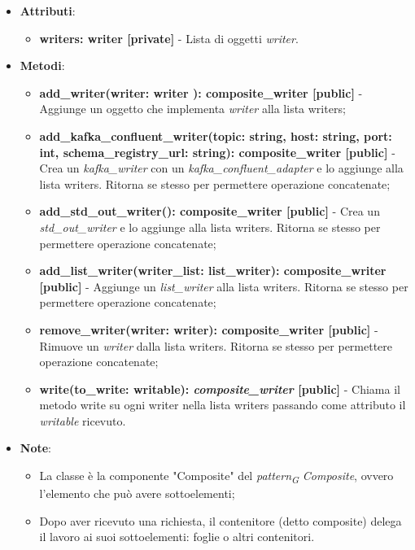 \begin{itemize}
    \begin{itemize}
    \item\textbf{Attributi}:
        \begin{itemize}
        \item \textbf{writers: writer [private]} - Lista di oggetti \textit{writer}.
    \end{itemize}
    \item \textbf{Metodi}:
    \begin{itemize}
        \item \textbf{add\_writer(writer: writer ): composite\_writer [public]} - Aggiunge un oggetto che implementa \textit{writer} alla lista writers;
        \item \textbf{add\_kafka\_confluent\_writer(topic: string, host: string, port: int, schema\_registry\_url: string): composite\_writer [public]} - Crea un \textit{kafka\_writer} con un \textit{kafka\_confluent\_adapter} e lo aggiunge alla lista writers. Ritorna se stesso per permettere operazione concatenate;
        \item \textbf{add\_std\_out\_writer(): composite\_writer [public]} - Crea un \textit{std\_out\_writer} e lo aggiunge alla lista writers. Ritorna se stesso per permettere operazione concatenate;
        \item \textbf{add\_list\_writer(writer\_list: list\_writer): composite\_writer [public]} - Aggiunge un \textit{list\_writer} alla lista writers. Ritorna se stesso per permettere operazione concatenate;
        \item \textbf{remove\_writer(writer: writer): composite\_writer [public]} - Rimuove un \textit{writer} dalla lista writers.  Ritorna se stesso per permettere operazione concatenate;
        \item \textbf{write(to\_write: writable): \textit{composite\_writer} [public]} - Chiama il metodo write su ogni writer nella lista writers passando come attributo il \textit{writable} ricevuto.
    \end{itemize}
    \item\textbf{Note}:
        \begin{itemize}
            \item La classe è la componente "Composite" del \textit{pattern}\textsubscript{\textit{G}} \textit{Composite}, ovvero l'elemento che può avere sottoelementi;
            \item Dopo aver ricevuto una richiesta, il contenitore (detto composite) delega il lavoro ai suoi sottoelementi: foglie o altri contenitori.

\end{itemize}
\end{itemize}
\end{itemize}
